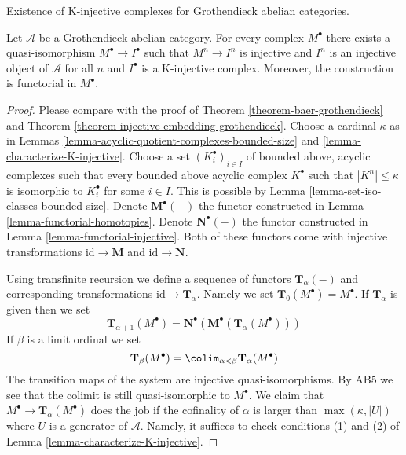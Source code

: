 \begin{theorem}
\label{theorem-K-injective-embedding-grothendieck}
\begin{slogan}
Existence of K-injective complexes for Grothendieck abelian categories.
\end{slogan}
Let $\mathcal{A}$ be a Grothendieck abelian category.
For every complex $M^\bullet$ there exists a quasi-isomorphism
$M^\bullet \to I^\bullet$ such that $M^n \to I^n$ is injective and $I^n$
is an injective object of $\mathcal{A}$ for all $n$ and $I^\bullet$
is a K-injective complex. Moreover, the construction is functorial in
$M^\bullet$.
\end{theorem}

\begin{proof}
Please compare with the proof of
Theorem \ref{theorem-baer-grothendieck}
and
Theorem \ref{theorem-injective-embedding-grothendieck}.
Choose a cardinal $\kappa$ as in
Lemmas \ref{lemma-acyclic-quotient-complexes-bounded-size} and
\ref{lemma-characterize-K-injective}.
Choose a set $(K_i^\bullet)_{i \in I}$
of bounded above, acyclic complexes
such that every bounded above acyclic complex $K^\bullet$
such that $|K^n| \leq \kappa$ is isomorphic to $K_i^\bullet$ for some
$i \in I$. This is possible by
Lemma \ref{lemma-set-iso-classes-bounded-size}.
Denote $\mathbf{M}^\bullet(-)$ the functor constructed in
Lemma \ref{lemma-functorial-homotopies}.
Denote $\mathbf{N}^\bullet(-)$ the functor constructed in
Lemma \ref{lemma-functorial-injective}.
Both of these functors come with injective transformations
$\text{id} \to \mathbf{M}$ and $\text{id} \to \mathbf{N}$.

\medskip\noindent
Using transfinite recursion we define a sequence of functors
$\mathbf{T}_\alpha(-)$ and corresponding transformations
$\text{id} \to \mathbf{T}_\alpha$. Namely we set
$\mathbf{T}_0(M^\bullet) = M^\bullet$. If $\mathbf{T}_\alpha$ is
given then we set
$$
\mathbf{T}_{\alpha + 1}(M^\bullet) =
\mathbf{N}^\bullet(\mathbf{M}^\bullet(\mathbf{T}_\alpha(M^\bullet)))
$$
If $\beta$ is a limit ordinal we set
$$
\mathbf{T}_\beta(M^\bullet) =
\colim_{\alpha < \beta} \mathbf{T}_\alpha(M^\bullet)
$$
The transition maps of the system are injective quasi-isomorphisms.
By AB5 we see that the colimit is still quasi-isomorphic to $M^\bullet$.
We claim that $M^\bullet \to \mathbf{T}_\alpha(M^\bullet)$
does the job if the cofinality of $\alpha$ is larger than
$\max(\kappa, |U|)$ where $U$ is a generator of $\mathcal{A}$.
Namely, it suffices to check conditions (1) and (2) of
Lemma \ref{lemma-characterize-K-injective}.


\end{proof}
